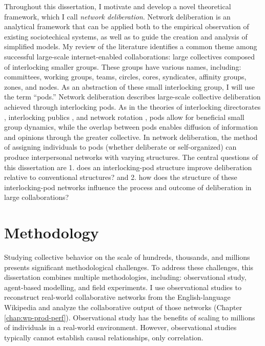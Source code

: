Throughout this dissertation,
I motivate and develop a novel theoretical framework,
which I call {\em network deliberation}.
Network deliberation is an analytical framework that can be applied both to the empirical observation of existing sociotechical systems,
as well as to guide the creation and analysis of simplified models.
My review of the literature identifies a common theme
among successful large-scale internet-enabled collaborations:
large collectives composed of interlocking smaller groups.
These groups have various names, including:
committees, working groups, teams, circles, cores, syndicates,
affinity groups, zones, and nodes.
As an abstraction of these small interlocking group, I will use the term ``pods.''
Network deliberation describes large-scale collective deliberation achieved
through interlocking pods.
As in the theories of interlocking directorates \cite{levine_study_1979},
interlocking publics \cite{habermas_structural_1991},
and network rotation \cite{salehi_hive_2018},
pods allow for beneficial small group dynamics,
while the overlap between pods enables diffusion of information and opinions
through the greater collective.
In network deliberation, the method of assigning individuals to pods
(whether deliberate or self-organized) can produce interpersonal networks with
varying structures.
The central questions of this dissertation are 1. does an interlocking-pod structure improve deliberation relative to conventional structures? and 2. how does the structure of these interlocking-pod networks influence the process and outcome of deliberation
in large collaborations?

\section{Methodology}

Studying collective behavior on the scale of hundreds, thousands, and millions
presents significant methodological challenges.
To address these challenges, this dissertation combines multiple methodologies,
including: observational study, agent-based modelling, and field experiments.
I use observational studies to reconstruct real-world collaborative networks
from the English-language Wikipedia and analyze the collaborative output of
those networks (Chapter \ref{chap:wp-prod-perf}).
Observational study has the benefits of scaling to millions of individuals
in a real-world environment.
However, observational studies typically cannot establish causal relationships,
only correlation.

